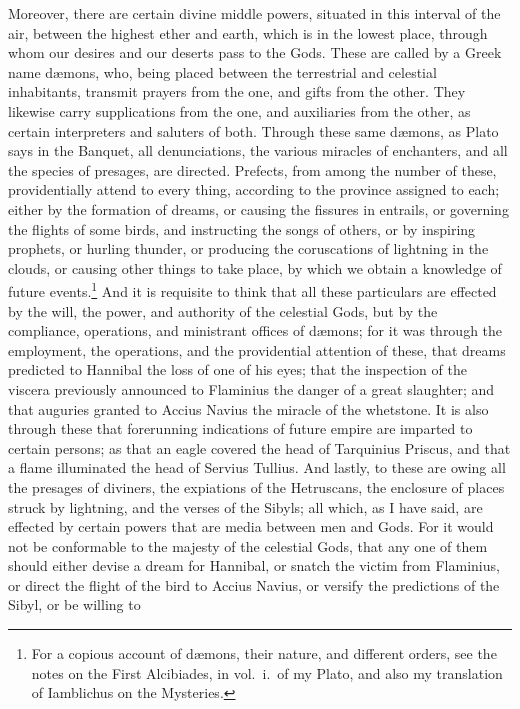 \documentclass{article}
\begin{document}
Moreover, there are certain divine middle powers, situated in this interval of
the air, between the highest ether and earth, which is in the lowest place,
through whom our desires and our deserts pass to the Gods.  These are called by
a Greek name d{\ae}mons, who, being placed between the terrestrial and
celestial inhabitants, transmit prayers from the one, and gifts from the other.
They likewise carry supplications from the one, and auxiliaries from the other,
as certain interpreters and saluters of both. Through these same d{\ae}mons, as
Plato says in the Banquet, all denunciations, the various miracles of
enchanters, and all the species of presages, are directed.  Prefects, from
among the number of these, providentially attend to every thing, according to
the province assigned to each; either by the formation of dreams, or causing
the fissures in entrails, or governing the flights of some birds, and
instructing the songs of others, or by inspiring prophets, or hurling thunder,
or producing the coruscations of lightning in the clouds, or causing other
things to take place, by which we obtain a knowledge of future
events.\footnote{For a copious account of d{\ae}mons, their nature, and
different orders, see the notes on the First Alcibiades, in vol.~i.~of
my Plato, and also my translation of Iamblichus on the
Mysteries.} And it is requisite to think that all these particulars are
effected by the will, the power, and authority of the celestial Gods, but by
the compliance, operations, and ministrant offices of d{\ae}mons; for it was
through the employment, the operations, and the providential attention of
these, that dreams predicted to Hannibal the loss of one of his eyes; that the
inspection of the viscera previously announced to Flaminius the danger of a
great slaughter; and that auguries granted to Accius Navius the miracle of the
whetstone. It is also through these that forerunning indications of future
empire are imparted to certain persons; as that an eagle covered the head of
Tarquinius Priscus, and that a flame illuminated the head of Servius Tullius.
And lastly, to these are owing all the presages of diviners, the expiations of
the Hetruscans, the enclosure of places struck by lightning, and the verses of
the Sibyls; all which, as I have said, are effected by certain powers that are
media between men and Gods.  For it would not be conformable to the majesty of
the celestial Gods, that any one of them should either devise a dream for
Hannibal, or snatch the victim from Flaminius, or direct the flight of the bird
to Accius Navius, or versify the predictions of the Sibyl, or be willing to
\end{document}

